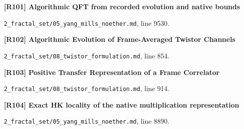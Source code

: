 \documentclass[11pt,a4paper]{article}
\begin{document}
\par\medskip\noindent\begin{minipage}{\linewidth}\textbf{[R101] Algorithmic QFT from recorded evolution and native bounds}\label{src:thm-ym-algorithmic-qft-synthesis}\par
{\small\texttt{}\par
\nolinkurl{2_fractal_set/05_yang_mills_noether.md}, line 9530.\par}
\end{minipage}\par

\par\medskip\noindent\begin{minipage}{\linewidth}\textbf{[R102] Algorithmic Evolution of Frame-Averaged Twistor Channels}\label{src:thm-effective-twistor-spectral-meaning}\par
{\small\texttt{}\par
\nolinkurl{2_fractal_set/08_twistor_formulation.md}, line 854.\par}
\end{minipage}\par

\par\medskip\noindent\begin{minipage}{\linewidth}\textbf{[R103] Positive Transfer Representation of a Frame Correlator}\label{src:cor-effective-twistor-positive-transfer}\par
{\small\texttt{}\par
\nolinkurl{2_fractal_set/08_twistor_formulation.md}, line 914.\par}
\end{minipage}\par

\par\medskip\noindent\begin{minipage}{\linewidth}\textbf{[R104] Exact HK locality of the native multiplication representation}\label{src:thm-ym-native-multiplication-locality}\par
{\small\texttt{}\par
\nolinkurl{2_fractal_set/05_yang_mills_noether.md}, line 8890.\par}
\end{minipage}\par
\end{document}

